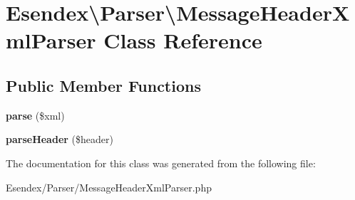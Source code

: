 \section{Esendex\textbackslash{}Parser\textbackslash{}Message\-Header\-Xml\-Parser Class Reference}
\label{class_esendex_1_1_parser_1_1_message_header_xml_parser}
\subsection*{Public Member Functions}
\begin{DoxyCompactItemize}
\item 
{\bfseries parse} (\$xml)\label{class_esendex_1_1_parser_1_1_message_header_xml_parser_a2ff7d89e6f0a13a7ac075242c3fd7364}

\item 
{\bfseries parse\-Header} (\$header)\label{class_esendex_1_1_parser_1_1_message_header_xml_parser_add263baad276ab6037dccb8cfbc20db9}

\end{DoxyCompactItemize}


The documentation for this class was generated from the following file\-:\begin{DoxyCompactItemize}
\item 
Esendex/\-Parser/Message\-Header\-Xml\-Parser.\-php\end{DoxyCompactItemize}
